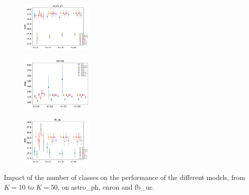 
\begin{subfigure}
     \centering
         \includegraphics[width=0.32\textwidth]{fig2/astro-ph_wsim_evo2__}
\end{subfigure}
\begin{subfigure}
         \centering
      \includegraphics[width=0.32\textwidth]{fig2/enron_wsim_evo2__}   
\end{subfigure}  
\begin{subfigure}
         \centering          
      \includegraphics[width=0.32\textwidth]{fig2/fb_uc_wsim_evo2__}
\end{subfigure}  
\caption{Impact of the number of classes on the performance of the different models, from $K=10$ to $K=50$, on astro\_ph, enron and fb\_uc.}

